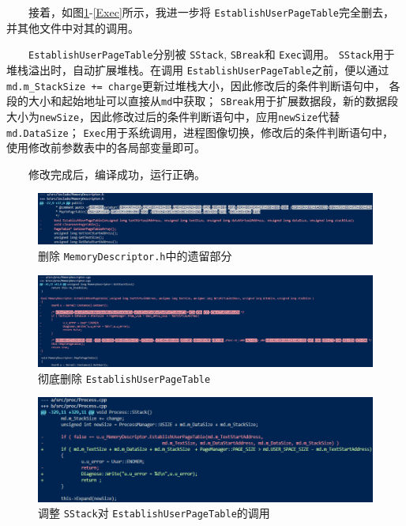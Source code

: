 　　接着，如图\ref{remain}-\ref{Exec}所示，我进一步将 \texttt{EstablishUserPageTable}完全删去，并其他文件中对其的调用。

　　\texttt{EstablishUserPageTable}分别被 \texttt{SStack}, \texttt{SBreak}和 \texttt{Exec}调用。
\texttt{SStack}用于堆栈溢出时，自动扩展堆栈。在调用 \texttt{EstablishUserPageTable}之前，便以通过\verb|md.m_StackSize += charge|更新过堆栈大小，因此修改后的条件判断语句中，
各段的大小和起始地址可以直接从\verb|md|中获取；
\texttt{SBreak}用于扩展数据段，新的数据段大小为\verb|newSize|，因此修改过后的条件判断语句中，应用\verb|newSize|代替\verb|md.DataSize|；
\texttt{Exec}用于系统调用，进程图像切换，修改后的条件判断语句中，使用修改前参数表中的各局部变量即可。

　　修改完成后，编译成功，运行正确。

\begin{figure}[!htbp]
    \centering
    \includegraphics[width=\textwidth]{images/remain.png}
    \caption{删除 \texttt{MemoryDescriptor.h}中的遗留部分}\label{remain}
\end{figure}

\begin{figure}[!htbp]
    \centering
    \includegraphics[width=\textwidth]{images/deleteAll.png}
    \caption{彻底删除 \texttt{EstablishUserPageTable}}\label{deleteAll}
\end{figure}

\begin{figure}[!htbp]
    \centering
    \includegraphics[width=\textwidth]{images/SStack.png}
    \caption{调整 \texttt{SStack}对 \texttt{EstablishUserPageTable}的调用}\label{SStack}
\end{figure}

